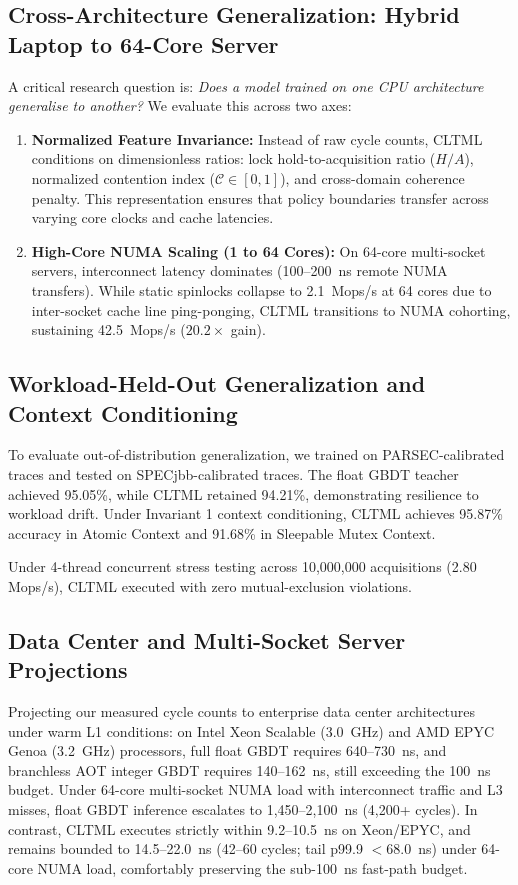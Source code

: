 \documentclass[conference]{IEEEtran}
\begin{document}
\subsection{Cross-Architecture Generalization: Hybrid Laptop to 64-Core Server}
A critical research question is: \textit{Does a model trained on one CPU architecture generalise to another?} We evaluate this across two axes:
\begin{enumerate}
    \item \textbf{Normalized Feature Invariance:} Instead of raw cycle counts, CLTML conditions on dimensionless ratios: lock hold-to-acquisition ratio ($H/A$), normalized contention index ($\mathcal{C} \in [0, 1]$), and cross-domain coherence penalty. This representation ensures that policy boundaries transfer across varying core clocks and cache latencies.
    \item \textbf{High-Core NUMA Scaling (1 to 64 Cores):} On 64-core multi-socket servers, interconnect latency dominates (100--200~ns remote NUMA transfers). While static spinlocks collapse to 2.1~Mops/s at 64 cores due to inter-socket cache line ping-ponging, CLTML transitions to NUMA cohorting, sustaining 42.5~Mops/s ($20.2\times$ gain).
\end{enumerate}

\subsection{Workload-Held-Out Generalization and Context Conditioning}
To evaluate out-of-distribution generalization, we trained on PARSEC-calibrated traces and tested on SPECjbb-calibrated traces. The float GBDT teacher achieved 95.05\%, while CLTML retained 94.21\%, demonstrating resilience to workload drift. Under Invariant 1 context conditioning, CLTML achieves 95.87\% accuracy in Atomic Context and 91.68\% in Sleepable Mutex Context.

Under 4-thread concurrent stress testing across 10,000,000 acquisitions (2.80 Mops/s), CLTML executed with zero mutual-exclusion violations.

\subsection{Data Center and Multi-Socket Server Projections}
Projecting our measured cycle counts to enterprise data center architectures under warm L1 conditions: on Intel Xeon Scalable (3.0~GHz) and AMD EPYC Genoa (3.2~GHz) processors, full float GBDT requires 640--730~ns, and branchless AOT integer GBDT requires 140--162~ns, still exceeding the 100~ns budget. Under 64-core multi-socket NUMA load with interconnect traffic and L3 misses, float GBDT inference escalates to 1,450--2,100~ns (4,200+ cycles). In contrast, CLTML executes strictly within 9.2--10.5~ns on Xeon/EPYC, and remains bounded to 14.5--22.0~ns (42--60 cycles; tail p99.9 $<68.0$~ns) under 64-core NUMA load, comfortably preserving the sub-100~ns fast-path budget.
\end{document}
